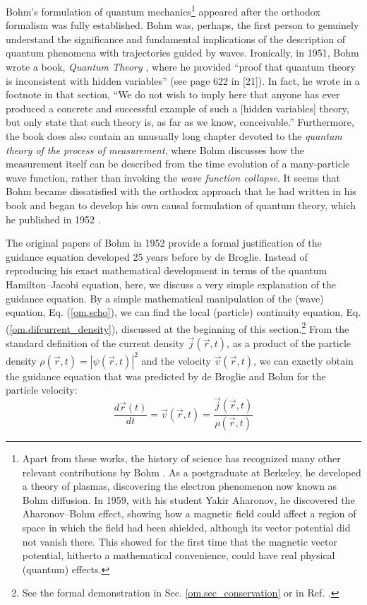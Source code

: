 \documentclass[nofootinbib, secnumarabic, amsmath, nobibnotes,10pt,aps,pra]{revtex4-1}
\newcommand{\sref}[1]{Sec. \ref{#1}}
\newcommand{\eref}[1]{Eq. (\ref{#1})}
\begin{document}
Bohm's formulation of quantum mechanics\footnote{Apart from these
works, the history of science has recognized many other relevant
contributions by Bohm \cite{om.infinite_potential}. As a
postgraduate at Berkeley, he developed a theory of plasmas,
discovering the electron phenomenon now known as Bohm diffusion. In
1959, with his student Yakir Aharonov, he discovered the
Aharonov--Bohm effect, showing how a magnetic field could affect a
region of space in which the field had been shielded, although its
vector potential did not vanish there. This showed for the first
time that the magnetic vector potential, hitherto a mathematical
convenience, could have real physical (quantum) effects.} appeared
after the orthodox formalism was fully established. Bohm was,
perhaps, the first person to genuinely understand the significance
and fundamental implications of the description of quantum phenomena
with trajectories guided by waves. Ironically, in 1951, Bohm wrote a
book, \textit{Quantum Theory} \cite{om.bohmbook}, where he provided
``proof that quantum theory is inconsistent with hidden variables''
(see page 622 in [21]). In fact, he wrote in a footnote in that section,
``We do not wish to imply here that anyone has ever produced a
concrete and successful example of such a [hidden variables] theory,
but only state that such theory is, as far as we know,
conceivable.'' Furthermore, the book does also contain an unusually
long chapter devoted to the \textit{quantum theory of the process of
measurement}, where Bohm discusses how the measurement itself can be
described from the time evolution of a many-particle wave function, rather than
invoking the \textit{wave function collapse}. It seems that Bohm
became dissatisfied with the orthodox approach that he had written
in his book and began to develop his own causal formulation of
quantum theory, which he published in 1952
\cite{om.bohm1952a,om.bohm1952b}.

The original papers of Bohm in 1952 \cite{om.bohm1952a,om.bohm1952b} provide
a formal justification of the guidance equation developed 25 years
before by de Broglie. Instead of reproducing his exact mathematical
development in terms of the quantum Hamilton--Jacobi equation, here, we
discuss a very simple explanation of the guidance equation. By a
simple mathematical manipulation of the (wave) equation,
\eref{om.scho}, we can find the local (particle) continuity
equation, \eref{om.difcurrent_density}, discussed at the beginning
of this section.\footnote{See the formal demonstration in
\sref{om.sec_conservation} or in Ref. \cite{om.cohen}.} From the
standard definition of the current density $\vec{j}(\vec{r},t)$, as
a product of the particle density $\rho(\vec{r},t) =
|\psi(\vec{r},t)|^2$ and the velocity $\vec{v}(\vec{r},t)$, we can
exactly obtain the guidance equation that was predicted by de
Broglie and Bohm for the particle velocity:
\begin{equation}
\label{om.guidance}
\frac{d\vec{r}(t)}{dt} = \vec{v}(\vec{r},t) = \frac{\vec{j}(\vec{r},t)} {\rho(\vec{r},t)}
\end{equation}
\end{document}
